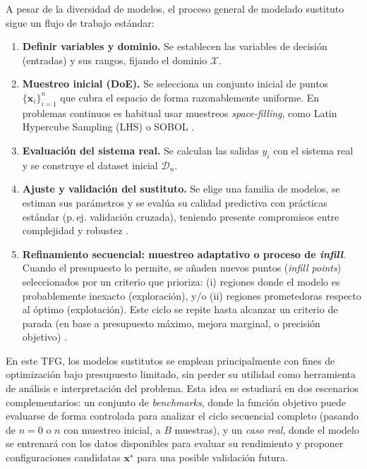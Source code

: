 \medskip
\noindent A pesar de la diversidad de modelos, el proceso general de modelado sustituto sigue un flujo de trabajo
estándar:
\begin{enumerate}
  \item \textbf{Definir variables y dominio.} Se establecen las variables de decisión (entradas)
  y sus rangos, fijando el dominio $\mathcal{X}$.
  \item \textbf{Muestreo inicial (DoE).} Se selecciona un conjunto inicial de puntos
  $\{\bm{x}_i\}_{i=1}^n$ que cubra el espacio de forma razonablemente uniforme. En problemas
  continuos es habitual usar muestreos \emph{space-filling}, como Latin Hypercube Sampling (LHS) o SOBOL
  \cite{forrester2008engineering}.
  \item \textbf{Evaluación del sistema real.} Se calculan las salidas $y_i$ con el sistema real
  y se construye el dataset inicial $\mathcal{D}_n$.
  \item \textbf{Ajuste y validación del sustituto.} Se elige una familia de modelos, se estiman sus
  parámetros y se evalúa su calidad predictiva con prácticas estándar (p.\,ej. validación cruzada),
  teniendo presente compromisos entre complejidad y robustez \cite{forrester2008engineering}.
  \item \textbf{Refinamiento secuencial: muestreo adaptativo o proceso de \emph{infill}}.
  Cuando el presupuesto lo permite, se añaden nuevos puntos (\emph{infill points}) seleccionados
  por un criterio que prioriza:
  (i) regiones donde el modelo es probablemente inexacto (exploración), y/o
  (ii) regiones prometedoras respecto al óptimo (explotación). Este ciclo se repite hasta alcanzar
  un criterio de parada (en base a presupuesto máximo, mejora marginal, o precisión objetivo) \cite{forrester2008engineering,jiang2020surrogate}.
\end{enumerate}

\medskip
\noindent En este TFG, los modelos sustitutos se emplean principalmente con fines de optimización
bajo presupuesto limitado, sin perder su utilidad como herramienta de análisis e
interpretación del problema. Esta idea se estudiará en dos escenarios complementarios:
un conjunto de \emph{benchmarks}, donde la función objetivo puede evaluarse de forma
controlada para analizar el ciclo secuencial completo (pasando de $n=0$ o $n$ con muestreo inicial, a $B$ muestras), y un \emph{caso real}, donde el modelo
se entrenará con los datos disponibles para evaluar su rendimiento y proponer
configuraciones candidatas $\bm{x}^\star$ para una posible validación futura.

